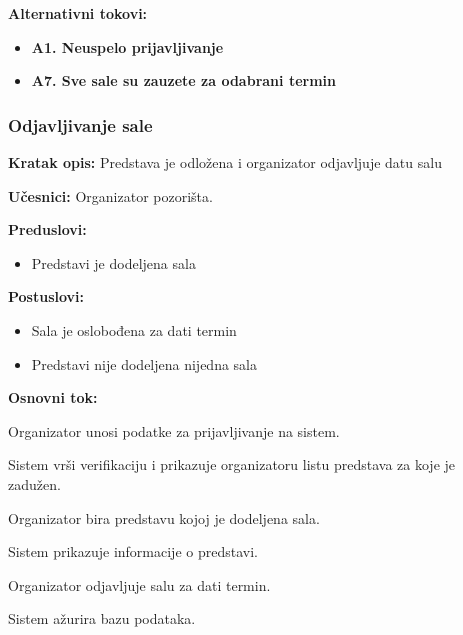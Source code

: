 \documentclass[a4paper]{article}
\begin{document}
\noindent\textbf{Alternativni tokovi:} 
\begin{itemize}
 \item \textbf{A1. Neuspelo prijavljivanje} 
  \item \textbf{A7. Sve sale su zauzete za odabrani termin} 
\end{itemize}
\subsubsection{Odjavljivanje sale}
\noindent\textbf{Kratak opis:} Predstava je odložena i organizator odjavljuje datu salu

\noindent\textbf{Učesnici:} Organizator pozorišta.

\noindent\textbf{Preduslovi:}
  \begin{itemize}
    \item Predstavi je dodeljena sala
  \end{itemize}

\noindent\textbf{Postuslovi:} 
  \begin{itemize}
    \item Sala je oslobođena za dati termin
    \item Predstavi nije dodeljena nijedna sala
  \end{itemize}

\noindent\textbf{Osnovni tok:}
  \begin{legal}
   \item Organizator unosi podatke za prijavljivanje na sistem.
    \item Sistem vrši verifikaciju i prikazuje organizatoru listu predstava za koje je zadužen.
    \item Organizator bira predstavu kojoj je dodeljena sala.
    \item Sistem prikazuje informacije o predstavi.
    \item Organizator odjavljuje salu za dati termin.
    \item Sistem ažurira bazu podataka.
  \end{legal}
\end{document}
